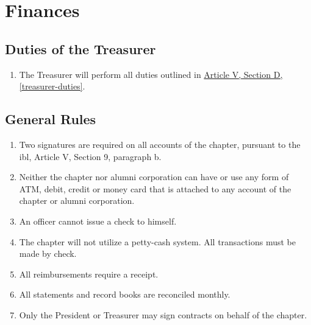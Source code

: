 
\chapter{Finances}

\section{Duties of the Treasurer}
	\begin{enumerate}
		\item The Treasurer will perform all duties outlined in \hyperref[treasurer-duties]{Article V, Section D, \autoref*{treasurer-duties}}. 
	\end{enumerate}

\section{General Rules}
	\label{fin-rules}
	\begin{enumerate}
		\item Two signatures are required on all accounts of the chapter, pursuant to the \gls{ibl}, Article V, Section 9, paragraph b.
		\item Neither the chapter nor alumni corporation can have or use any form of ATM, debit, credit or money card that is attached to any account of the chapter or alumni corporation.
		\item An officer cannot issue a check to himself.
		\item The chapter will not utilize a petty-cash system. All transactions must be made by
		check.
		\item All reimbursements require a receipt.
		\item All statements and record books are reconciled monthly.
        \item Only the President or Treasurer may sign contracts on behalf of the chapter.
	\end{enumerate}

